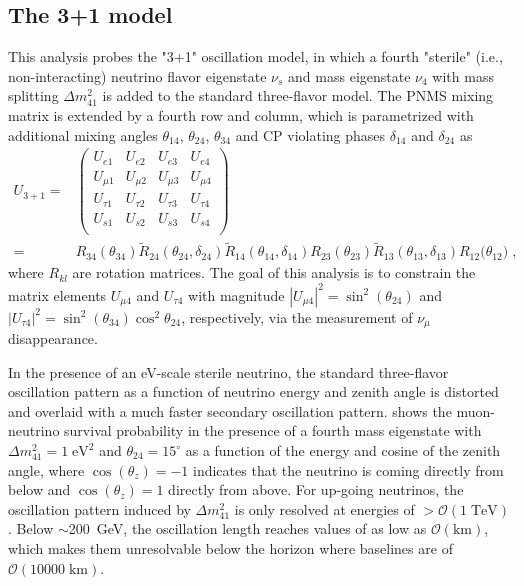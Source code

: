 \subsection{The 3+1 model}
This analysis probes the "3+1" oscillation model, in which a fourth "sterile" (i.e., non-interacting) neutrino flavor eigenstate $\nu_s$ and mass eigenstate $\nu_4$ with mass splitting $\Delta m^2_{41}$ is added to the standard three-flavor model.
The PNMS mixing matrix is extended by a fourth row and column, which is parametrized with additional mixing angles $\theta_{14}$, $\theta_{24}$, $\theta_{34}$ and CP violating phases $\delta_{14}$ and $\delta_{24}$ as
\begin{align*}
    U_{3+1} =&\begin{pmatrix}
    U_{e1}    & U_{e2}    & U_{e3}   &U_{e4}    \\
    U_{\mu1}  & U_{\mu2}  & U_{\mu3} &U_{\mu4}  \\
    U_{\tau1} & U_{\tau2} & U_{\tau3}&U_{\tau4} \\
    U_{s1} & U_{s2} & U_{s3}&U_{s4} \\
    \end{pmatrix}\\
    =&
    R_{34}(\theta_{34})
    \tilde{R}_{24}(\theta_{24}, \delta_{24})
    \tilde{R}_{14}(\theta_{14}, \delta_{14})
    R_{23}(\theta_{23})
    \tilde{R}_{13}(\theta_{13}, \delta_{13})
    R_{12}({\theta_{12})}\;,
\end{align*}
where $R_{kl}$ are rotation matrices.
The goal of this analysis is to constrain the matrix elements $U_{\mu4}$ and $U_{\tau4}$ with magnitude $|U_{\mu4}|^2=\sin^2(\theta_{24})$ and  $|U_{\tau4}|^2=\sin^2(\theta_{34})\cos^2\theta_{24}$, respectively, via the measurement of $\nu_\mu$ disappearance.

In the presence of an eV-scale sterile neutrino, the standard three-flavor oscillation pattern as a function of neutrino energy and zenith angle is distorted and overlaid with a much faster secondary oscillation pattern.
 shows the muon-neutrino survival probability in the presence of a fourth mass eigenstate with $\Delta m^2_{41}=1\;\mathrm{eV^2}$ and $\theta_{24}=15^\circ$ as a function of the energy and cosine of the zenith angle, where $\cos(\theta_z)=-1$ indicates that the neutrino is coming directly from below and $\cos(\theta_z)=1$ directly from above.
For up-going neutrinos, the oscillation pattern induced by $\Delta m^2_{41}$ is only resolved at energies of $>\mathcal{O}(1\;\mathrm{TeV})$.
Below $\sim$200~GeV, the oscillation length reaches values of as low as $\mathcal{O}(\mathrm{km})$, which makes them unresolvable below the horizon where baselines are of $\mathcal{O}(10000\;\mathrm{km})$.


